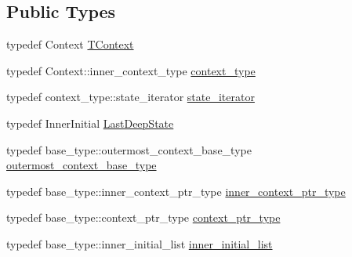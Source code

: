 \subsection*{Public Types}
\begin{DoxyCompactItemize}
\item 
typedef Context \hyperlink{classsmacc_1_1SmaccState_a9953ba0428a8c46f7d72c70bc3f87db4}{T\+Context}
\item 
typedef Context\+::inner\+\_\+context\+\_\+type \hyperlink{classsmacc_1_1SmaccState_a65c128d05dbcadbf817f41ba20b8fa01}{context\+\_\+type}
\item 
typedef context\+\_\+type\+::state\+\_\+iterator \hyperlink{classsmacc_1_1SmaccState_a12497b38e710f07cacb5d45efc024339}{state\+\_\+iterator}
\item 
typedef Inner\+Initial \hyperlink{classsmacc_1_1SmaccState_a60088405d2d99d468caa0baa3b2830a8}{Last\+Deep\+State}
\item 
typedef base\+\_\+type\+::outermost\+\_\+context\+\_\+base\+\_\+type \hyperlink{classsmacc_1_1SmaccState_aaf76bbe2aa9dd73e3284605f84ab4b16}{outermost\+\_\+context\+\_\+base\+\_\+type}
\item 
typedef base\+\_\+type\+::inner\+\_\+context\+\_\+ptr\+\_\+type \hyperlink{classsmacc_1_1SmaccState_a65a772c2e2039e9a59148ba6ffb54d8a}{inner\+\_\+context\+\_\+ptr\+\_\+type}
\item 
typedef base\+\_\+type\+::context\+\_\+ptr\+\_\+type \hyperlink{classsmacc_1_1SmaccState_a0e15b77514301039f6bc093a9d3f6425}{context\+\_\+ptr\+\_\+type}
\item 
typedef base\+\_\+type\+::inner\+\_\+initial\+\_\+list \hyperlink{classsmacc_1_1SmaccState_acb4ac84bce421d39b594510a6b2df558}{inner\+\_\+initial\+\_\+list}
\end{DoxyCompactItemize}
